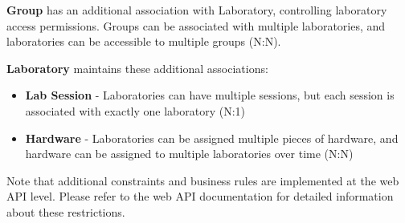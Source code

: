 \textbf{Group} has an additional association with Laboratory, controlling laboratory access permissions. Groups can be associated with multiple laboratories, and laboratories can be accessible to multiple groups (N:N).

\textbf{Laboratory} maintains these additional associations:
\begin{itemize}
    \item \textbf{Lab Session} - Laboratories can have multiple sessions, but each session is associated with exactly one laboratory (N:1)
    \item \textbf{Hardware} - Laboratories can be assigned multiple pieces of hardware, and hardware can be assigned to multiple laboratories over time (N:N)
\end{itemize}

Note that additional constraints and business rules are implemented at the web API level. Please refer to the web API documentation for detailed information about these restrictions.